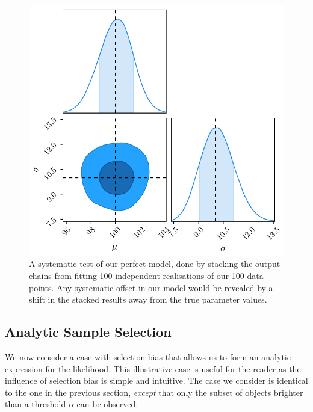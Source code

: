 \documentclass[a4paper,fleqn,usenatbib]{mnras}
\begin{document}
\begin{figure}
	\begin{center}
		\includegraphics[width=\columnwidth]{example/perfect.pdf}
	\end{center}
	\caption{A systematic test of our perfect model, done by stacking the output chains from fitting 100 independent realisations of our 100 data points. Any systematic offset in our model would be revealed by a shift in the stacked results away from the true parameter values.}
	\label{fig:perfect}
\end{figure}









\subsection{Analytic Sample Selection}
\label{sec:imperfect}

We now consider a case with selection bias that allows us to form an analytic expression for the likelihood.  This illustrative case is useful for the reader as the influence of selection bias is simple and intuitive. The case we consider is identical to the one in the previous section, \textit{except} that only the subset of objects brighter than a threshold $\alpha$ can be observed.
\end{document}
